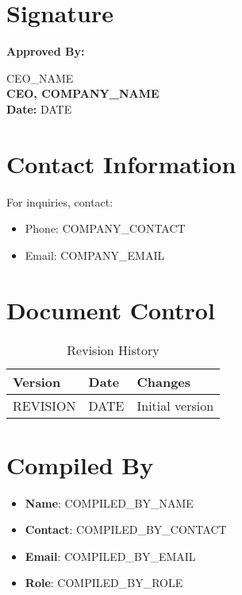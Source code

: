 \documentclass[12pt]{article}
\begin{document}
\section{Signature}
\textbf{Approved By:}

{{CEO_NAME}}\\
\textbf{CEO, {{COMPANY_NAME}}}\\
\textbf{Date:} {{DATE}}

\section{Contact Information}
For inquiries, contact:
\begin{itemize}
    \item Phone: {{COMPANY_CONTACT}}
    \item Email: {{COMPANY_EMAIL}}
\end{itemize}

\section{Document Control}
\begin{table}[h]
    \centering
    \begin{tabular}{p{3cm}p{3cm}p{6cm}}
        \toprule
        \textbf{Version} & \textbf{Date} & \textbf{Changes} \\
        \midrule
        {{REVISION}} & {{DATE}} & Initial version \\
        \bottomrule
    \end{tabular}
    \caption{Revision History}
\end{table}

\section{Compiled By}
\begin{itemize}
    \item \textbf{Name}: {{COMPILED_BY_NAME}}
    \item \textbf{Contact}: {{COMPILED_BY_CONTACT}}
    \item \textbf{Email}: {{COMPILED_BY_EMAIL}}
    \item \textbf{Role}: {{COMPILED_BY_ROLE}}
\end{itemize}
\end{document}
